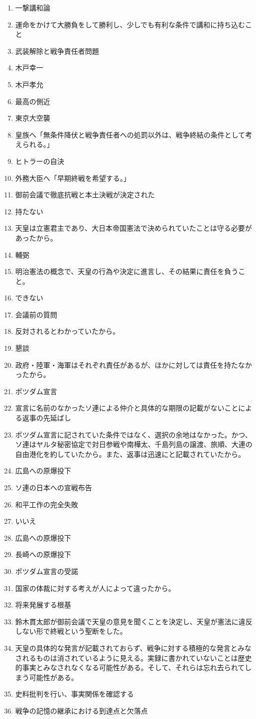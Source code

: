 \documentclass[]{jsarticle}
\begin{document}
\begin{enumerate}
	\item 一撃講和論
	\item 運命をかけて大勝負をして勝利し、少しでも有利な条件で講和に持ち込むこと
		\\
	\item 武装解除と戦争責任者問題
	\item 木戸幸一
	\item 木戸孝允
	\item 最高の側近
	\item 東京大空襲
	\item 皇族へ「無条件降伏と戦争責任者への処罰以外は、戦争終結の条件として考えられる。」
	\item ヒトラーの自決
	\item 外務大臣へ「早期終戦を希望する。」
	\item 御前会議で徹底抗戦と本土決戦が決定された
	\item 持たない
	\item 天皇は立憲君主であり、大日本帝国憲法で決められていたことは守る必要があったから。
	\item 輔弼
	\item 明治憲法の概念で、天皇の行為や決定に進言し、その結果に責任を負うこと。
	\\
	\item できない
	\item 会議前の質問
	\item 反対されるとわかっていたから。
	\item 懇談
	\item 政府・陸軍・海軍はそれぞれ責任があるが、ほかに対しては責任を持たなかったから。
	\item ポツダム宣言
	\item 宣言に名前のなかったソ連による仲介と具体的な期限の記載がないことによる返事の先延ばし
	\item ポツダム宣言に記されていた条件ではなく、選択の余地はなかった。かつ、ソ連はヤルタ秘密協定で対日参戦や南樺太、千島列島の譲渡、旅順、大連の自由港化を約していたから。また、返事は迅速にと記載されていたから。
	\item 広島への原爆投下
	\item ソ連の日本への宣戦布告
	\item 和平工作の完全失敗
	\item いいえ
	\item 広島への原爆投下
	\item 長崎への原爆投下
	\item ポツダム宣言の受諾
	\item 国家の体裁に対する考えが人によって違ったから。
	\item 将来発展する根基
	\item 鈴木貫太郎が御前会議で天皇の意見を聞くことを決定し、天皇が憲法に違反しない形で終戦という聖断をした。
	\\
	\item 天皇の具体的な発言が記載されておらず、戦争に対する積極的な発言とみなされるものは消されているように見える。実録に書かれていないことは歴史的事実とみなされなくなる可能性がある。そして、それらは忘れ去られてしまう可能性がある。
	\item 史料批判を行い、事実関係を確認する
	\item 戦争の記憶の継承における到達点と欠落点
\end{enumerate}
\end{document}
